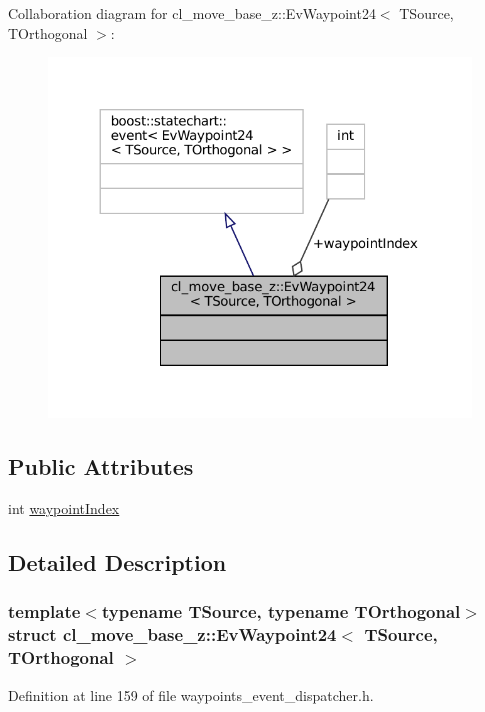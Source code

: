 Collaboration diagram for cl\+\_\+move\+\_\+base\+\_\+z\+:\+:Ev\+Waypoint24$<$ T\+Source, T\+Orthogonal $>$\+:
\nopagebreak
\begin{figure}[H]
\begin{center}
\leavevmode
\includegraphics[width=324pt]{structcl__move__base__z_1_1EvWaypoint24__coll__graph}
\end{center}
\end{figure}
\subsection*{Public Attributes}
\begin{DoxyCompactItemize}
\item 
int \hyperlink{structcl__move__base__z_1_1EvWaypoint24_a387f5ca4189f298747de9a49e85513bc}{waypoint\+Index}
\end{DoxyCompactItemize}


\subsection{Detailed Description}
\subsubsection*{template$<$typename T\+Source, typename T\+Orthogonal$>$\newline
struct cl\+\_\+move\+\_\+base\+\_\+z\+::\+Ev\+Waypoint24$<$ T\+Source, T\+Orthogonal $>$}



Definition at line 159 of file waypoints\+\_\+event\+\_\+dispatcher.\+h.



